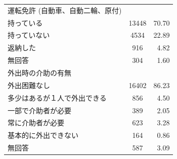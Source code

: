 \documentclass[a4paper,12pt, uplatex]{jsbook}
\begin{document}
\begin{table}[h]
\begin{tabular}{lcr}
        運転免許 (自動車、自動二輪、原付) & & \\
        \hspace{1em} 持っている & 13448 & 70.70 \\
        \hspace{1em} 持っていない & 4534 & 22.89 \\
        \hspace{1em} 返納した & 916 & 4.82 \\
        \hspace{1em} 無回答 & 304 & 1.60 \\

        外出時の介助の有無 & & \\
        \hspace{1em} 外出困難なし & 16402	& 86.23 \\
        \hspace{1em} 多少はあるが１人で外出できる & 856	& 4.50 \\
        \hspace{1em} 一部で介助者が必要 & 389	& 2.05 \\
        \hspace{1em} 常に介助者が必要 & 623	& 3.28 \\
        \hspace{1em} 基本的に外出できない & 164	& 0.86 \\
        \hspace{1em} 無回答 & 587	& 3.09 \\


        \bottomrule
    \end{tabular}
    \label{tab:個人データ概要}
\end{table}
\end{document}
